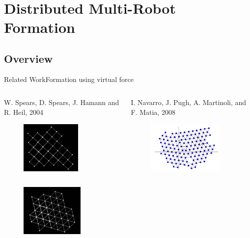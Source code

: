 \section{Distributed Multi-Robot Formation}
\tableofcontents[currentsection] 
\subsection[problem]{Overview}
\begin{frame}{Related Work}{Formation using virtual force}
   \begin{columns}[T] 
    \begin{column}{.45\textwidth}
      \scriptsize{W. Spears, D. Spears, J. Hamann and R. Heil, 2004}
      \begin{figure}
        \centering
        \includegraphics[height=1in]{figs/spears1.png}
      \end{figure}
    \end{column}%
    \begin{column}{.45\textwidth}
      \scriptsize{I. Navarro, J. Pugh, A. Martinoli, and
        F. Matia, 2008}
      \begin{figure}
        \centering
        \includegraphics[height=1in]{figs/navarro.png}
      \end{figure}      
    \end{column}
  \end{columns}
  \vspace{3mm}
  \begin{columns}[T] 
    \begin{column}{.45\textwidth}
      \begin{figure}
        \centering
        \includegraphics[height=1in]{figs/spears2.png}     

\end{figure}
\end{column}
\end{columns}
\end{frame}
